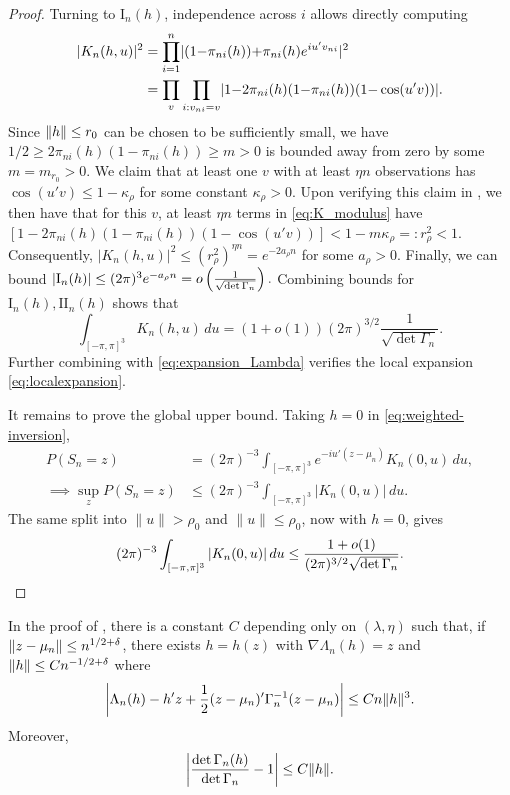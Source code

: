 \documentclass[12pt,reqno]{amsart}
\begin{document}
\begin{proof}
Turning to \(\mathrm{I}_n(h)\),
independence across $i$ allows
directly computing
\begin{align}
	|K_n(h, u)|^2
	&= \prod_{i=1}^n \abs{(1{-}\pi_{ni}(h)) {+} \pi_{ni}(h) e^{iu'v_{ni}}}^2
	\notag
	\\
	&=
	\prod_v\prod_{i: v_{ni}=v} \abs{1{-}2\pi_{ni}(h) (1{-}\pi_{ni}(h)) (1{-}\cos(u'v))}.
	\label{eq:K_modulus}
\end{align}
Since $\norm{h} \le r_0$ can be chosen to be sufficiently small,
we have $1/2 \ge 2\pi_
{ni} (h)
(1-\pi_{ni}(h)) \ge m > 0$ is bounded away from zero by some $ m = m_{r_0} > 0$. We claim
that at least one $v$ with at least $\eta n$ observations has $\cos(u'v) \le
1-\kappa_\rho$ for some constant $\kappa_\rho > 0$.
Upon verifying this claim in
, we then have that
for this $v$, at least $\eta n$ terms in \eqref{eq:K_modulus} have \(
	[1-2\pi_{ni}(h) (1-\pi_{ni}(h)) (1-\cos(u'v))] < 1-m\kappa_\rho =: r_\rho^2 < 1.
\)
Consequently, \(
	|K_n(h, u)|^2 \le (r_\rho^2)^{\eta n} = e^{-2a_\rho n}
\)
for some $a_\rho > 0$. Finally, we can bound \(
	|\mathrm{I}_n(h)| \le (2\pi)^3 e^{-a_\rho n} = o\pr{
	\frac{1}{\sqrt{\det \Gamma_n}}}.
\)
Combining bounds for $\mathrm{I}_n(h), \mathrm{II}_n(h)$ shows that \[
	\int_{[-\pi, \pi]^3} K_n(h, u) \,du = (1+o(1)) (2\pi)^{3/2} \frac{1}{\sqrt{\det
	\Gamma_n}}.
\]
Further combining with \eqref{eq:expansion_Lambda} verifies the local expansion
\eqref{eq:localexpansion}.

\medskip
It remains to prove the global upper bound.  Taking \(h=0\) in
\eqref{eq:weighted-inversion},
\begin{align*}
P(S_n=z)
&=
(2\pi)^{-3}\int_{[-\pi,\pi]^3}
e^{-iu'(z-\mu_n)}K_n(0,u)\,du,
\\
\implies
\sup_zP(S_n=z)
&\le
(2\pi)^{-3}\int_{[-\pi,\pi]^3}|K_n(0,u)|\,du.
\end{align*}
The same split into \(\|u\|>\rho_0\) and \(\|u\|\le\rho_0\), now with \(h=0\),
gives
\[
	(2\pi)^{-3}\int_{[-\pi,\pi]^3}|K_n(0,u)|\,du
	\le
	\frac{1+o(1)}{(2\pi)^{3/2}\sqrt{\det\Gamma_n}}.
    \qedhere
\]
\end{proof}

\begin{lem}\label{lem:saddlepoint}
In the proof of , there is a constant $C$ depending only on $(\lambda,\eta)$ such that, if $\norm{z-\mu_n} \le n^{1/2+\delta}$, there exists
$h = h(z)$ with $\nabla \Lambda_n (h) = z$
and $\norm{h} \le C n^{-1/2 + \delta}$ where \[
	\abs[\bigg]{ \Lambda_n(h) - h'z + \frac{1}{2} (z-\mu_n)' \Gamma_n^{-1} (z-\mu_n)} \le
	C n
	\norm{h}^3.
\]
Moreover, \[
	\abs[\bigg]{\frac{\det \Gamma_n(h)}{\det \Gamma_n} - 1} \le C \norm{h}.
\]
\end{lem}
\end{document}
